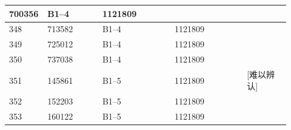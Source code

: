 \documentclass[UTF8,10pt,a4paper,fontset=fandol]{ctexart}
\newcommand{\fieldvalue}[1]{#1}
\newcommand{\handwritten}[1]{#1}
\begin{document}
\begin{center}
\begin{tabular}{|p{0.08\linewidth}|p{0.19\linewidth}|p{0.25\linewidth}|p{0.25\linewidth}|p{0.15\linewidth}|}
\fieldvalue{700356} &
\fieldvalue{B1--4} &
\fieldvalue{1121809} & \\ \hline
\fieldvalue{348} &
\fieldvalue{713582} &
\fieldvalue{B1--4} &
\fieldvalue{1121809} & \\ \hline
\fieldvalue{349} &
\fieldvalue{725012} &
\fieldvalue{B1--4} &
\fieldvalue{1121809} & \\ \hline
\fieldvalue{350} &
\fieldvalue{737038} &
\fieldvalue{B1--4} &
\fieldvalue{1121809} & \\ \hline
\fieldvalue{351} &
\fieldvalue{145861} &
\fieldvalue{B1--5} &
\fieldvalue{1121809} &
\fieldvalue{\handwritten{[难以辨认]}} \\ \hline
\fieldvalue{352} &
\fieldvalue{152203} &
\fieldvalue{B1--5} &
\fieldvalue{1121809} & \\ \hline
\fieldvalue{353} &
\fieldvalue{160122} &
\fieldvalue{B1--5} &
\fieldvalue{1121809} & \\ \hline

\end{tabular}
\end{center}
\end{document}
